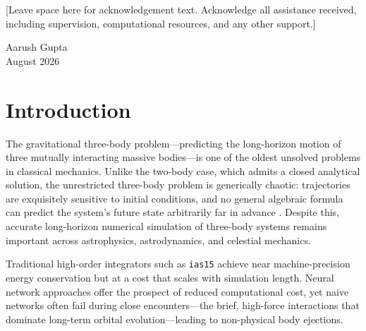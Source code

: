\documentclass[12pt]{article}
\begin{document}
\vspace{1cm}

[Leave space here for acknowledgement text. Acknowledge all assistance received,
including supervision, computational resources, and any other support.]

\vspace{2cm}
\noindent Aarush Gupta\\
August 2026

\newpage
\thispagestyle{empty}


\newpage
\thispagestyle{empty}
\tableofcontents

\newpage
{}
\setcounter{page}{1}

\section{Introduction}
\label{sec:introduction_v3}

The gravitational three-body problem---predicting the long-horizon motion of three mutually
interacting massive bodies---is one of the oldest unsolved problems in classical mechanics.
Unlike the two-body case, which admits a closed analytical solution, the unrestricted
three-body problem is generically chaotic: trajectories are exquisitely sensitive to
initial conditions, and no general algebraic formula can predict the system's future state
arbitrarily far in advance \citep{poincare1890sur}. Despite this, accurate long-horizon
numerical simulation of three-body systems remains important across astrophysics, astrodynamics,
and celestial mechanics.

Traditional high-order integrators such as \texttt{ias15} \citep{Rein_2014} achieve near
machine-precision energy conservation but at a cost that scales with simulation length.
Neural network approaches offer the prospect of reduced computational cost, yet naive networks
often fail during close encounters---the brief, high-force interactions that dominate
long-term orbital evolution---leading to non-physical body ejections.
\end{document}
